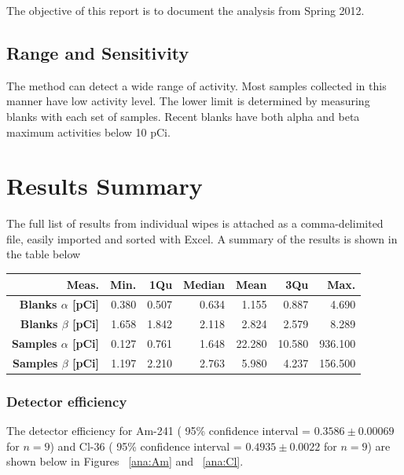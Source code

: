 \documentclass[letterpaper,12pt]{article}
\begin{document}
The objective of this report is to document the analysis
from Spring 2012.

\subsection*{Range and Sensitivity}
The method can detect a wide range of activity.  Most samples
collected in this manner have low activity level. The lower limit
is determined by measuring blanks with each set of samples. Recent
blanks have both alpha and beta maximum activities below 10 pCi.

\section*{Results Summary}
The full list of results from individual wipes is attached as
a comma-delimited file, easily imported and sorted with Excel.
A summary of the results is shown in the table below

\begin{center}
   \begin{tabular}{| r | r | r | r | r | r | r |}
   \hline
   \textbf{Meas.}                  &  Min. &  1Qu  & Median & Mean   &  3Qu   &   Max.  \\
   \hline
   \textbf{Blanks  $\alpha$ [pCi]} & 0.380 & 0.507 & 0.634  & 1.155  & 0.887  & 4.690  \\
   \hline
   \textbf{Blanks  $\beta$ [pCi]}  & 1.658 & 1.842 & 2.118  & 2.824  & 2.579  & 8.289 \\
   \hline
   \textbf{Samples $\alpha$ [pCi]} & 0.127 & 0.761 & 1.648  & 22.280 & 10.580 & 936.100 \\
   \hline
   \textbf{Samples $\beta$ [pCi]}  & 1.197 & 2.210 & 2.763  & 5.980  & 4.237  & 156.500   \\
   \hline
   \end{tabular}

\end{center}

\subsubsection*{Detector efficiency}
The detector efficiency for  Am-241
( 95\% confidence interval = $0.3586\pm 0.00069$ for $n=9$)
and Cl-36
( 95\% confidence interval = $0.4935\pm 0.0022$ for $n=9$)
are shown below in
Figures ~\ref{ana:Am} and ~\ref{ana:Cl}. 
\end{document}
